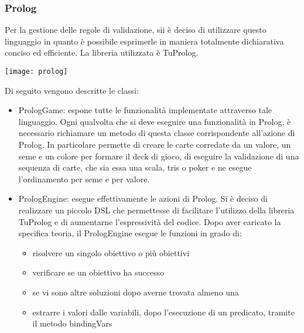 \subsubsection{Prolog}
Per la gestione delle regole di validazione, sii è deciso di utilizzare questo linguaggio in quanto è possibile esprimerle in maniera totalmente dichiarativa conciso ed efficiente.
La libreria utilizzata è TuProlog.
\begin{center}
    \texttt{[image: prolog]}
\end{center}
Di seguito vengono descritte le classi:
\begin{itemize}
    \item PrologGame: espone tutte le funzionalità implementate attraverso tale linguaggio.
    Ogni qualvolta che si deve eseguire una funzionalità in Prolog, è necessario richiamare un metodo di questa classe corrispondente all’azione di Prolog.
    In particolare permette di creare le carte corredate da un valore, un seme e un colore per formare il deck di gioco, di eseguire la validazione di una sequenza di carte, che sia essa una scala, tris o poker e ne esegue l’ordinamento per seme e per valore.

    \item PrologEngine: esegue effettivamente le azioni di Prolog.
    Si è deciso di realizzare un piccolo DSL che permettesse di facilitare l’utilizzo della libreria TuProlog e di aumentarne l’espressività del codice.
    Dopo aver caricato la specifica teoria, il PrologEngine esegue le funzioni in grado di:
    \begin{itemize}
        \item risolvere un singolo obiettivo o più obiettivi
        \item verificare se un obiettivo ha successo
        \item se vi sono altre soluzioni dopo averne trovata almeno una
        \item estrarre i valori dalle variabili, dopo l’esecuzione di un predicato, tramite il metodo bindingVars
    \end{itemize}


\end{itemize}
